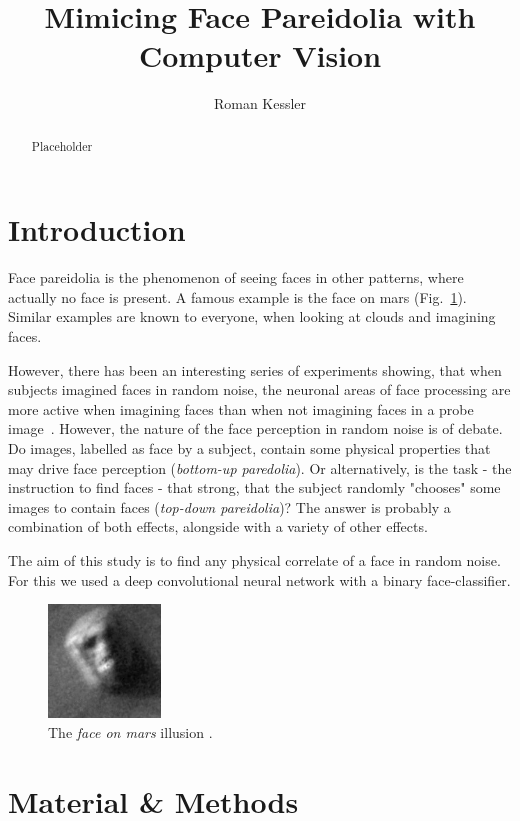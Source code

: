 \documentclass[10pt,a4paper,twocolumn]{article}
\author{Roman Kessler}
\title{Mimicing Face Pareidolia with Computer Vision}
\begin{document}
\maketitle

\begin{abstract}
Placeholder
\end{abstract}

\section{Introduction}

Face pareidolia is the phenomenon of seeing faces in other patterns, where actually no face is present. A famous example is the face on mars (Fig.~\ref{fig:faceonmars}). Similar examples are known to everyone, when looking at clouds and imagining faces.

However, there has been an interesting series of experiments showing, that when subjects imagined faces in random noise, the neuronal areas of face processing are more active when imagining faces than when not imagining faces in a probe image~\cite{zimmermann2019illusory}. However, the nature of the face perception in random noise is of debate. Do images, labelled as face by a subject, contain some physical properties that may drive face perception (\emph{bottom-up paredolia}). Or alternatively, is the task - the instruction to find faces - that strong, that the subject randomly "chooses" some images to contain faces (\emph{top-down pareidolia})? The answer is probably a combination of both effects, alongside with a variety of other effects.

The aim of this study is to find any physical correlate of a face in random noise. For this we used a deep convolutional neural network with a binary face-classifier.


\begin{figure}
    \centering
    \includegraphics[width=3.0cm]{faceonmars.png}
    \caption{The \emph{face on mars} illusion \cite{carlotto1988digital}.}
    \label{fig:faceonmars}
\end{figure}

\section{Material \& Methods}
\end{document}
